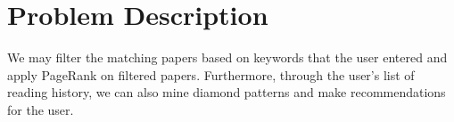 \section{Problem Description}

We may filter the matching papers based on keywords that the user entered and apply PageRank on filtered papers. Furthermore, through the user’s list of reading history, we can also mine diamond patterns and make recommendations for the user.